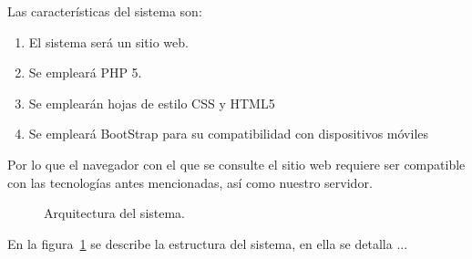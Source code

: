 Las características del sistema son:

\begin{enumerate}
	\item  El sistema será un sitio web.
	\item  Se empleará PHP 5.
	\item Se emplearán hojas de estilo CSS y HTML5
	\item Se empleará BootStrap para su compatibilidad con dispositivos móviles
\end{enumerate}

Por lo que el navegador con el que se consulte el sitio web requiere ser compatible con las tecnologías antes mencionadas, así como nuestro servidor.


\begin{figure}[htbp!]
	\begin{center}
		\caption{Arquitectura del sistema.}
		\label{fig:arquitectura}
	\end{center}
\end{figure}

En la figura~\ref{fig:arquitectura} se describe la estructura del sistema, en ella se detalla ...

